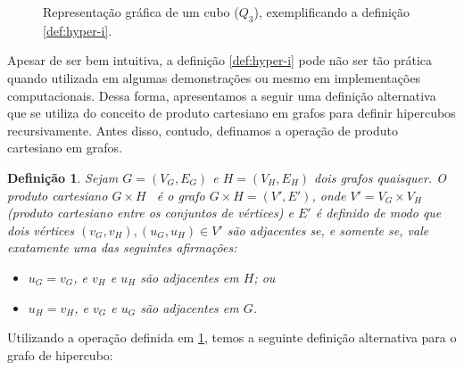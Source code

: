 \documentclass[12pt, a4paper]{article}
\newtheorem{definition}{Definição}[section]
\begin{document}
\begin{figure}[h]
    \centering
    \caption{Representação gráfica de um cubo ($Q_3$), exemplificando a definição \ref{def:hyper-i}.}
    \label{fig:cube-graph}
\end{figure}

Apesar de ser bem intuitiva, a definição \ref{def:hyper-i} pode não ser tão prática quando utilizada em algumas demonstrações ou mesmo em implementações computacionais. Dessa forma, apresentamos a seguir uma definição alternativa que se utiliza do conceito de produto cartesiano em grafos para definir hipercubos recursivamente. Antes disso, contudo, definamos a operação de produto cartesiano em grafos.

\begin{definition} \label{def:cartesian-prod}
Sejam $G = (V_G, E_G)$ e $H = (V_H, E_H)$ dois grafos quaisquer. O produto cartesiano $G \times H$~\cite[p.~22]{harary_graph_2001} é o grafo $G\times H = (V', E')$, onde $V' = V_G \times V_H$ (produto cartesiano entre os conjuntos de vértices) e $E'$ é definido de modo que dois vértices $(v_G, v_H), (u_G, u_H) \in V'$ são adjacentes se, e somente se, vale exatamente uma das seguintes afirmações:
\begin{itemize}
    \item $u_G = v_G$, e $v_H$ e $u_H$ são adjacentes em $H$; ou
    \item $u_H = v_H$, e $v_G$ e $u_G$ são adjacentes em $G$.
\end{itemize}
\end{definition}

Utilizando a operação definida em \ref{def:cartesian-prod}, temos a seguinte definição alternativa para o grafo de hipercubo:
\end{document}
